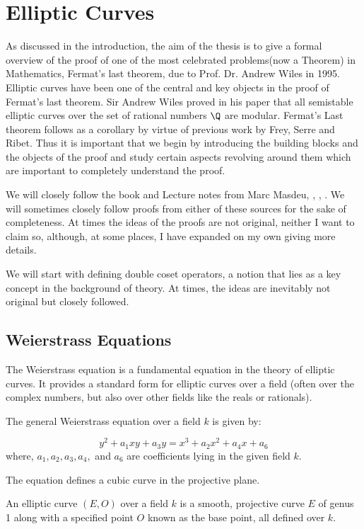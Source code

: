 \section{Elliptic Curves}\label{Chapter: Elliptic Curves}

As discussed in the introduction, the aim of the thesis is to give a formal overview of the proof of one of the most celebrated problems(now a Theorem) in Mathematics, Fermat's last theorem, due to Prof. Dr. Andrew Wiles in 1995. Elliptic curves have been one of the central and key objects in the proof of  Fermat's last theorem. Sir Andrew Wiles proved in his paper that all semistable elliptic curves over the set of rational numbers $\Q$ are modular. Fermat’s Last theorem follows as a corollary by virtue of previous work by Frey, Serre and Ribet. Thus it is important that we begin by introducing the building blocks and the objects of the proof and study certain aspects revolving around them which are important to completely understand the proof. 

We will closely follow the book \cite{diamond2005first} and Lecture notes from Marc Masdeu, \cite{Masdeu2015ModularForms} , \cite{bostonFermat}, \cite{silv}.  We will sometimes closely follow proofs from either of these sources for the sake of completeness. At times the ideas of the proofs are not original, neither I want to claim so, although, at some places,  I have expanded on my own giving more details.  

We will start with defining double coset operators, a notion that lies as a key concept in the background of theory. 
At times, the ideas are inevitably not original but closely followed.


\subsection{Weierstrass Equations}
 The Weierstrass equation is a fundamental equation in the theory of elliptic curves. It provides a standard form for elliptic curves over a field (often over the complex numbers, but also over other fields like the reals or rationals).
\begin{definition}
 The general Weierstrass equation over a field $k$ is given by:

\[ y^2 + a_1xy + a_3y = x^3 + a_2x^2 + a_4x + a_6 \] where, \( a_1, a_2, a_3, a_4, \) and \( a_6 \) are coefficients lying in the given field $k$.
\end{definition}

\begin{remark}
The equation defines a cubic curve in the projective plane.
\end{remark}
\begin{definition}
An elliptic curve $(E, O)$ over a field $k$ is a smooth, projective curve $E$ of genus 1 along with a specified point $O$ known as the base point, all defined over $k$. \\
\end{definition}
 
